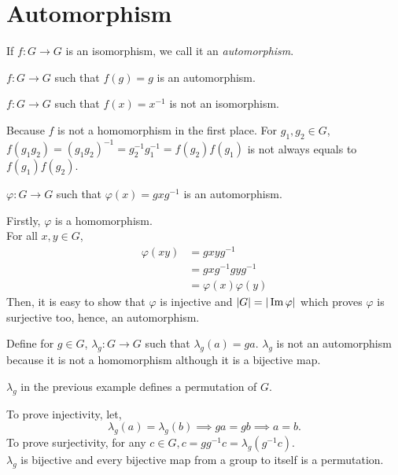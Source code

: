 \section{Automorphism}
\begin{definition}[Automorphism]
    If $f:G \rightarrow G$ is an isomorphism, we call it an \textit{automorphism}.
\end{definition}
\begin{eg}
    $f:G \rightarrow G$ such that $f(g) = g$ is an automorphism.
\end{eg}
\begin{noneg}
    $f:G \rightarrow G$ such that $f(x) = x^{-1}$ is not an isomorphism.
\end{noneg}
\begin{explanation}
    Because $f$ is not a homomorphism in the first place. For $g_1, g_2 \in G$,
        $f(g_1g_2) = (g_1g_2)^{-1} = g_2^{-1}g_1^{-1} = f(g_2) f(g_1)$ is not always equals to $f(g_1)f(g_2)$.
\end{explanation}
\begin{eg}
    $\varphi : G \rightarrow G$ such that $\varphi(x) = gxg^{-1}$ is an automorphism.
\end{eg}
\begin{explanation}
    Firstly, $\varphi$ is a homomorphism.\\
    For all $x,y \in G$,
    \begin{align*}
        \varphi(xy) &= gxyg^{-1}\\
                    &= gxg^{-1}gyg^{-1}\\
                    &= \varphi(x) \varphi(y)
    \end{align*}
    Then, it is easy to show that $\varphi$ is injective and $|G| = |\operatorname{Im} \varphi|$ which proves $\varphi$ is surjective too, hence, an automorphism.
\end{explanation}
\begin{noneg}
    Define for $g \in G$, $\lambda_g: G \rightarrow G$ such that $\lambda_g(a) = ga$. $\lambda_g$ is not an automorphism because it is not a homomorphism although it is a bijective map.
\end{noneg}
\begin{lemma}
    $\lambda_g$ in the previous example defines a permutation of $G$. 
\end{lemma}
\begin{lemmaproof}
    To prove injectivity, let,
    $$\lambda_g(a) = \lambda_g(b) \implies ga = gb \implies a = b.$$
    To prove surjectivity, for any $c \in G, c = g g^{-1}c = \lambda_g(g^{-1}c).$\\
    $\lambda_g$ is bijective and every bijective map from a group to itself is a permutation.
\end{lemmaproof}
